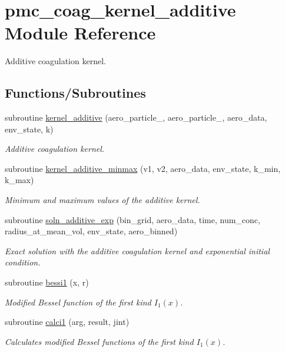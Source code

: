 \hypertarget{namespacepmc__coag__kernel__additive}{}\section{pmc\+\_\+coag\+\_\+kernel\+\_\+additive Module Reference}
\label{namespacepmc__coag__kernel__additive}


Additive coagulation kernel.  


\subsection*{Functions/\+Subroutines}
\begin{DoxyCompactItemize}
\item 
subroutine \mbox{\hyperlink{namespacepmc__coag__kernel__additive_a104dc134e55b7e9c4271f754feb593c0}{kernel\+\_\+additive}} (aero\+\_\+particle\+\_, aero\+\_\+particle\+\_, aero\+\_\+data, env\+\_\+state, k)
\begin{DoxyCompactList}\small\item\em Additive coagulation kernel. \end{DoxyCompactList}\item 
subroutine \mbox{\hyperlink{namespacepmc__coag__kernel__additive_a3dee17def226de61de0ca4074f77c86e}{kernel\+\_\+additive\+\_\+minmax}} (v1, v2, aero\+\_\+data, env\+\_\+state, k\+\_\+min, k\+\_\+max)
\begin{DoxyCompactList}\small\item\em Minimum and maximum values of the additive kernel. \end{DoxyCompactList}\item 
subroutine \mbox{\hyperlink{namespacepmc__coag__kernel__additive_a18a49b373123a332e3e5a91c6f88b6b1}{soln\+\_\+additive\+\_\+exp}} (bin\+\_\+grid, aero\+\_\+data, time, num\+\_\+conc, radius\+\_\+at\+\_\+mean\+\_\+vol, env\+\_\+state, aero\+\_\+binned)
\begin{DoxyCompactList}\small\item\em Exact solution with the additive coagulation kernel and exponential initial condition. \end{DoxyCompactList}\item 
subroutine \mbox{\hyperlink{namespacepmc__coag__kernel__additive_ad76a37daef190b75b015ac1441f32e17}{bessi1}} (x, r)
\begin{DoxyCompactList}\small\item\em Modified Bessel function of the first kind $ I_1(x) $. \end{DoxyCompactList}\item 
subroutine \mbox{\hyperlink{namespacepmc__coag__kernel__additive_a033edc5451a3797e4d922139dd6dad0f}{calci1}} (arg, result, jint)
\begin{DoxyCompactList}\small\item\em Calculates modified Bessel functions of the first kind $ I_1(x) $. \end{DoxyCompactList}\end{DoxyCompactItemize}
